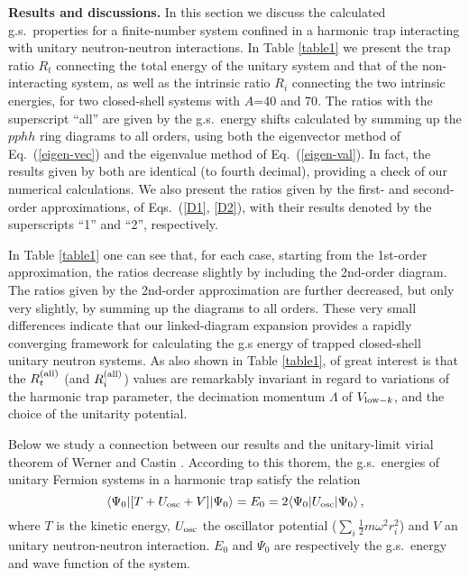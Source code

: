 \documentclass[twocolumn,preprintnumbers,superscriptaddress]{revtex4}
\begin{document}
\vskip 0.4cm
{\bf Results and discussions.}
In this section we discuss the calculated g.s.~properties
for a finite-number system confined in a harmonic trap
interacting with unitary neutron-neutron interactions.
In Table \ref{table1} we present the trap ratio $R_t$ connecting
the total energy of the unitary system and that of the non-interacting system,
as well as the intrinsic ratio $R_i$ connecting
the two intrinsic energies, for two closed-shell systems with $A$=40 and 70.
The ratios with the superscript ``all'' are given
by the g.s.~energy shifts calculated by
summing up the $pphh$ ring diagrams
to all orders, using both the eigenvector method of Eq.~(\ref{eigen-vec})
and the eigenvalue method of Eq.~(\ref{eigen-val}). In fact, the results given by both are
identical (to fourth decimal), providing a check of
our numerical calculations.
We also present the ratios given
by the first- and second-order approximations, of Eqs.~(\ref{D1}, \ref{D2}),
with their results denoted by the superscripts ``1'' and ``2'', respectively.

In Table \ref{table1} one can see that, for each case,
starting from the 1st-order approximation,
the ratios decrease slightly by including the 2nd-order diagram.
The ratios given by the 2nd-order approximation are further decreased,
but only very slightly, by summing up the diagrams to all orders.
These very small differences indicate that  our  linked-diagram expansion
provides  a rapidly converging framework for calculating
the g.s energy of
trapped closed-shell unitary neutron systems.
As also shown in Table \ref{table1}, of great interest is that
the $R_t^{\rm (all)}$ (and $R_i^{\rm (all)}$) values
are remarkably invariant in regard to variations of the harmonic trap parameter,
the decimation momentum $\Lambda$ of $V_{{\rm low}-k}$,
and the choice of the unitarity potential.


Below we study a connection between
our results and the unitary-limit virial theorem
of Werner and Castin \cite{virial}. According to  this thorem,
the g.s.~energies of unitary Fermion systems in a harmonic trap
satisfy the relation
\begin{equation}
\langle \Psi_0|[T +U_{\rm osc} +V]|\Psi _0   \rangle=E_0
=2 \langle \Psi_0|U_{\rm osc}|\Psi _0   \rangle \,,
\end{equation}
where $T$ is the kinetic energy,  $U_{\rm osc}$ the oscillator potential
($\sum_i \frac{1}{2}m\omega ^2 r_i^2$) and $V$ an unitary neutron-neutron
interaction. $E_0$ and $\Psi_0$ are respectively the g.s.~energy
and wave function of the system.
\end{document}

